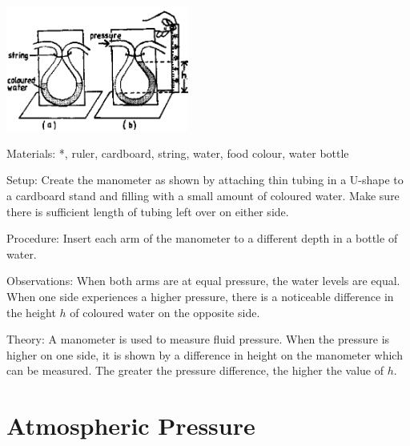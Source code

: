 \begin{multicols}{2}
\begin{center}
\includegraphics[width=0.45\textwidth]{./img/source/manometer.png}
\end{center}

\begin{description*}
\item[Materials:]{*, ruler, cardboard, string, water, food colour, water bottle}
\item[Setup:]{Create the manometer as shown by attaching thin tubing in a U-shape to a cardboard stand and filling with a small amount of coloured water. Make sure there is sufficient length of tubing left over on either side.}
\item[Procedure:]{Insert each arm of the manometer to a different depth in a bottle of water.}
\item[Observations:]{When both arms are at equal pressure, the water levels are equal. When one side experiences a higher pressure, there is a noticeable difference in the height $h$ of coloured water on the opposite side.}
\item[Theory:]{A manometer is used to measure fluid pressure. When the pressure is higher on one side, it is shown by a difference in height on the manometer which can be measured. The greater the pressure difference, the higher the value of $h$.}
\end{description*}


\section*{Atmospheric Pressure}
\label{sec:atm-pressure}



\end{multicols}
